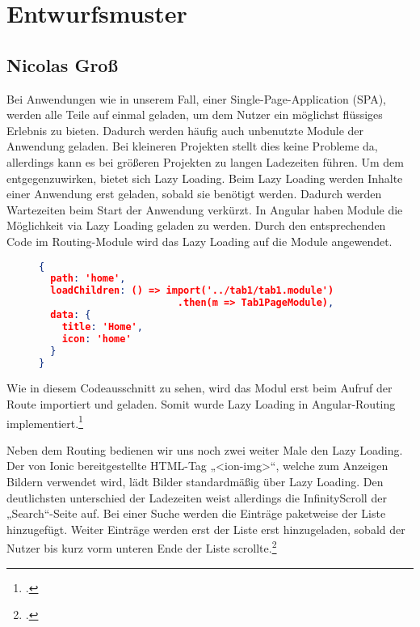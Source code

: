 
\section{Entwurfsmuster}

\subsection*{Nicolas Groß}

Bei Anwendungen wie in unserem Fall, einer Single-Page-Application (SPA), werden alle Teile auf einmal geladen, um dem Nutzer ein möglichst flüssiges Erlebnis zu bieten. Dadurch werden häufig auch unbenutzte Module der Anwendung geladen. Bei kleineren Projekten stellt dies keine Probleme da, allerdings kann es bei größeren Projekten zu langen Ladezeiten führen. Um dem entgegenzuwirken, bietet sich Lazy Loading. Beim Lazy Loading werden Inhalte einer Anwendung erst geladen, sobald sie benötigt werden. Dadurch werden Wartezeiten beim Start der Anwendung verkürzt.
In Angular haben Module die Möglichkeit via Lazy Loading geladen zu werden. Durch den entsprechenden Code im Routing-Module wird das Lazy Loading auf die Module angewendet.

\begin{figure}[bht]
\begin{lstlisting}[caption=Codeausschnitt des Tabs Routingmodule,language=json]
{
  path: 'home',
  loadChildren: () => import('../tab1/tab1.module')
                        .then(m => Tab1PageModule),
  data: {
    title: 'Home', 
    icon: 'home'
  }
}
\end{lstlisting}
\end{figure}

Wie in diesem Codeausschnitt zu sehen, wird das Modul erst beim Aufruf der Route importiert und geladen. Somit wurde Lazy Loading in Angular-Routing implementiert.\footcites[.vgl]{LazyLoading2021}

Neben dem Routing bedienen wir uns noch zwei weiter Male den Lazy Loading. Der von Ionic bereitgestellte HTML-Tag „<ion-img>“, welche zum Anzeigen Bildern verwendet wird, lädt Bilder standardmäßig über Lazy Loading. Den deutlichsten unterschied der Ladezeiten weist allerdings die InfinityScroll der „Search“-Seite auf. Bei einer Suche werden die Einträge paketweise der Liste hinzugefügt. Weiter Einträge werden erst der Liste erst hinzugeladen, sobald der Nutzer bis kurz vorm unteren Ende der Liste scrollte.\footcites[.vgl]{Ionic2013b}

